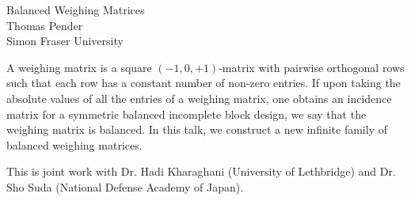 \documentclass[a4paper,11pt]{article}
\begin{document}
\begin{center}
  {\Large Balanced Weighing Matrices} \\
  \vspace*{3mm}
  Thomas Pender \\
  \vspace*{3mm}
  Simon Fraser University
\end{center}

A weighing matrix is a square $(-1,0,+1)$-matrix with pairwise orthogonal rows
such that each row has a constant number of non-zero entries. If upon taking the
absolute values of all the entries of a weighing matrix, one obtains an
incidence matrix for a symmetric balanced incomplete block design, we say that
the weighing matrix is balanced. In this talk, we construct a new infinite
family of balanced weighing matrices. 

This is joint work with Dr. Hadi Kharaghani (University of Lethbridge) and Dr.
Sho Suda (National Defense Academy of Japan).
\end{document}
